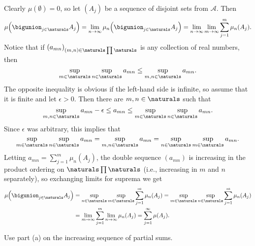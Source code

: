 \documentclass[a4paper, 11pt]{memoir}
\theoremstyle{plaincustomnumber}
\theoremstyle{changedotbreakcustomnumber}
\newcommand{\calA}{\mathcal{A}}
\begin{document}
\begin{solution}
\begin{solutionsec}
    \item Clearly $\mu(\emptyset) = 0$, so let $(A_j)$ be a sequence of disjoint sets from $\calA$. Then
    \begin{equation*}
        \mu \Bigl( \bigunion_{j \in \naturals} A_j \Bigr)
            = \lim_{n \to \infty} \mu_n \Bigl( \bigunion_{j \in \naturals} A_j \Bigr)
            = \lim_{n \to \infty} \lim_{m \to \infty} \sum_{j=1}^m \mu_n(A_j).
    \end{equation*}
    Notice that if $(a_{mn})_{(m,n) \in \naturals \prod \naturals}$ is any collection of real numbers, then
    \begin{equation*}
        \sup_{m \in \naturals} \sup_{n \in \naturals} a_{mn}
            \leq \sup_{m,n \in \naturals} a_{mn}.
    \end{equation*}
    The opposite inequality is obvious if the left-hand side is infinite, so assume that it is finite and let $\epsilon > 0$. Then there are $m,n \in \naturals$ such that
    \begin{equation*}
        \sup_{m,n \in \naturals} a_{mn} - \epsilon
            \leq a_{mn}
            \leq \sup_{m \in \naturals} \sup_{n \in \naturals} a_{mn}.
    \end{equation*}
    Since $\epsilon$ was arbitrary, this implies that
    \begin{equation*}
        \sup_{m \in \naturals} \sup_{n \in \naturals} a_{mn}
            = \sup_{m,n \in \naturals} a_{mn}
            = \sup_{n \in \naturals} \sup_{m \in \naturals} a_{mn}.
    \end{equation*}
    Letting $a_{mn} = \sum_{j=1}^m \mu_n(A_j)$, the double sequence $(a_{mn})$ is increasing in the product ordering on $\naturals \prod \naturals$ (i.e., increasing in $m$ and $n$ separately), so exchanging limits for suprema we get
    \begin{align*}
        \mu \Bigl( \bigunion_{j \in \naturals} A_j \Bigr)
            &= \sup_{n \in \naturals} \sup_{m \in \naturals} \sum_{j=1}^m \mu_n(A_j)
             = \sup_{m \in \naturals} \sup_{n \in \naturals} \sum_{j=1}^m \mu_n(A_j) \\
            &= \lim_{m \to \infty} \sum_{j=1}^m \lim_{n \to \infty} \mu_n(A_j)
             = \sum_{j=1}^\infty \mu(A_j).
    \end{align*}

    \item Use part (a) on the increasing sequence of partial sums.
\end{solutionsec}
\end{solution}
\end{document}
